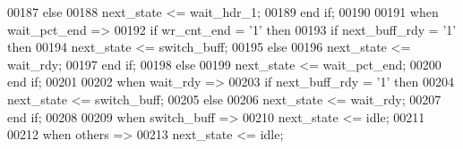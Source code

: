 \begin{DoxyCode}
00187          \textcolor{keywordflow}{else} 
00188             \textcolor{vhdlchar}{next_state} \textcolor{vhdlchar}{<=} \textcolor{vhdlchar}{wait\_hdr\_1};
00189          \textcolor{keywordflow}{end} \textcolor{keywordflow}{if};
00190          
00191       \textcolor{keywordflow}{when} \textcolor{vhdlchar}{wait\_pct\_end} \textcolor{vhdlchar}{=}\textcolor{vhdlchar}{>}
00192          \textcolor{keywordflow}{if} \textcolor{vhdlchar}{wr_cnt_end} \textcolor{vhdlchar}{=} \textcolor{vhdlchar}{'}\textcolor{vhdllogic}{}\textcolor{vhdllogic}{1}\textcolor{vhdlchar}{'} \textcolor{keywordflow}{then}
00193             \textcolor{keywordflow}{if} \textcolor{vhdlchar}{next_buff_rdy} \textcolor{vhdlchar}{=} \textcolor{vhdlchar}{'}\textcolor{vhdllogic}{}\textcolor{vhdllogic}{1}\textcolor{vhdlchar}{'} \textcolor{keywordflow}{then} 
00194                \textcolor{vhdlchar}{next_state} \textcolor{vhdlchar}{<=} \textcolor{vhdlchar}{switch\_buff};
00195             \textcolor{keywordflow}{else} 
00196                \textcolor{vhdlchar}{next_state} \textcolor{vhdlchar}{<=} \textcolor{vhdlchar}{wait\_rdy};
00197             \textcolor{keywordflow}{end} \textcolor{keywordflow}{if};
00198          \textcolor{keywordflow}{else} 
00199             \textcolor{vhdlchar}{next_state} \textcolor{vhdlchar}{<=} \textcolor{vhdlchar}{wait\_pct\_end};
00200          \textcolor{keywordflow}{end} \textcolor{keywordflow}{if};
00201        
00202       \textcolor{keywordflow}{when} \textcolor{vhdlchar}{wait\_rdy} \textcolor{vhdlchar}{=}\textcolor{vhdlchar}{>} 
00203          \textcolor{keywordflow}{if} \textcolor{vhdlchar}{next_buff_rdy} \textcolor{vhdlchar}{=} \textcolor{vhdlchar}{'}\textcolor{vhdllogic}{}\textcolor{vhdllogic}{1}\textcolor{vhdlchar}{'} \textcolor{keywordflow}{then} 
00204             \textcolor{vhdlchar}{next_state} \textcolor{vhdlchar}{<=} \textcolor{vhdlchar}{switch\_buff};
00205          \textcolor{keywordflow}{else} 
00206             \textcolor{vhdlchar}{next_state} \textcolor{vhdlchar}{<=} \textcolor{vhdlchar}{wait\_rdy};
00207          \textcolor{keywordflow}{end} \textcolor{keywordflow}{if};
00208          
00209       \textcolor{keywordflow}{when} \textcolor{vhdlchar}{switch\_buff} \textcolor{vhdlchar}{=}\textcolor{vhdlchar}{>} 
00210          \textcolor{vhdlchar}{next_state} \textcolor{vhdlchar}{<=} \textcolor{vhdlchar}{idle};
00211          
00212         \textcolor{keywordflow}{when} \textcolor{keywordflow}{others} \textcolor{vhdlchar}{=}\textcolor{vhdlchar}{>} 
00213             \textcolor{vhdlchar}{next_state} \textcolor{vhdlchar}{<=} \textcolor{vhdlchar}{idle};

\end{DoxyCode}
